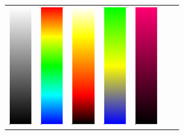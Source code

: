 \begin{figure}[htbp]
    \centering
    \begin{tabular}{ccccccc}
    \includegraphics[height=2in]{figures/colormaps/grayscale.png}&
      \includegraphics[height=2in]{figures/colormaps/rainbow.png}&
      \includegraphics[height=2in]{figures/colormaps/heatmap.png}&         
     \includegraphics[height=2in]{figures/colormaps/blueYellowGreen.png}&
      \includegraphics[height=2in]{figures/colormaps/blackGradient.png}&

\end{tabular}
\end{figure}
